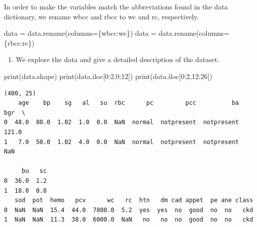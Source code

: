 \documentclass[
  11pt,
  letterpaper,
  DIV=11,
  numbers=noendperiod]{scrartcl}
\newenvironment{Shaded}{\begin{snugshade}}{\end{snugshade}}
\newcommand{\BuiltInTok}[1]{\textcolor[rgb]{0.00,0.23,0.31}{#1}}
\newcommand{\DecValTok}[1]{\textcolor[rgb]{0.68,0.00,0.00}{#1}}
\newcommand{\NormalTok}[1]{\textcolor[rgb]{0.00,0.23,0.31}{#1}}
\newcommand{\OperatorTok}[1]{\textcolor[rgb]{0.37,0.37,0.37}{#1}}
\newcommand{\StringTok}[1]{\textcolor[rgb]{0.13,0.47,0.30}{#1}}
\providecommand{\tightlist}{%
  \setlength{\itemsep}{0pt}\setlength{\parskip}{0pt}}\usepackage{longtable,booktabs,array}
\begin{document}
In order to make the variables match the abbreviations found in the data
dictionary, we rename wbcc and rbcc to wc and rc, respectively.

\begin{Shaded}
\begin{Highlighting}[]
\NormalTok{data }\OperatorTok{=}\NormalTok{ data.rename(columns}\OperatorTok{=}\NormalTok{\{}\StringTok{\textquotesingle{}wbcc\textquotesingle{}}\NormalTok{:}\StringTok{\textquotesingle{}wc\textquotesingle{}}\NormalTok{\})}
\NormalTok{data }\OperatorTok{=}\NormalTok{ data.rename(columns}\OperatorTok{=}\NormalTok{\{}\StringTok{\textquotesingle{}rbcc\textquotesingle{}}\NormalTok{:}\StringTok{\textquotesingle{}rc\textquotesingle{}}\NormalTok{\})}
\end{Highlighting}
\end{Shaded}

\begin{enumerate}
\def\labelenumi{\arabic{enumi}.}
\setcounter{enumi}{2}
\tightlist
\item
  We explore the data and give a detailed description of the dataset.
\end{enumerate}

\begin{Shaded}
\begin{Highlighting}[]
\BuiltInTok{print}\NormalTok{(data.shape)}
\BuiltInTok{print}\NormalTok{(data.iloc[}\DecValTok{0}\NormalTok{:}\DecValTok{2}\NormalTok{,}\DecValTok{0}\NormalTok{:}\DecValTok{12}\NormalTok{])}
\BuiltInTok{print}\NormalTok{(data.iloc[}\DecValTok{0}\NormalTok{:}\DecValTok{2}\NormalTok{,}\DecValTok{12}\NormalTok{:}\DecValTok{26}\NormalTok{])}
\end{Highlighting}
\end{Shaded}

\begin{verbatim}
(400, 25)
    age    bp    sg   al   su  rbc      pc         pcc          ba    bgr  \
0  48.0  80.0  1.02  1.0  0.0  NaN  normal  notpresent  notpresent  121.0   
1   7.0  50.0  1.02  4.0  0.0  NaN  normal  notpresent  notpresent    NaN   

     bu   sc  
0  36.0  1.2  
1  18.0  0.8  
   sod  pot  hemo   pcv      wc   rc  htn   dm cad appet  pe ane class
0  NaN  NaN  15.4  44.0  7800.0  5.2  yes  yes  no  good  no  no   ckd
1  NaN  NaN  11.3  38.0  6000.0  NaN   no   no  no  good  no  no   ckd
\end{verbatim}
\end{document}
